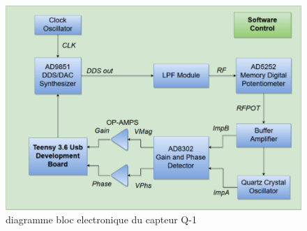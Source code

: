 \begin{figure}[H]
    \centering
    \includegraphics[width=\textwidth]{assets/figures/electronic block diagram QCM.png}
    \caption{diagramme bloc electronique du capteur Q-1}
    \label{fig:bloc diagram Q-1}
\end{figure}

